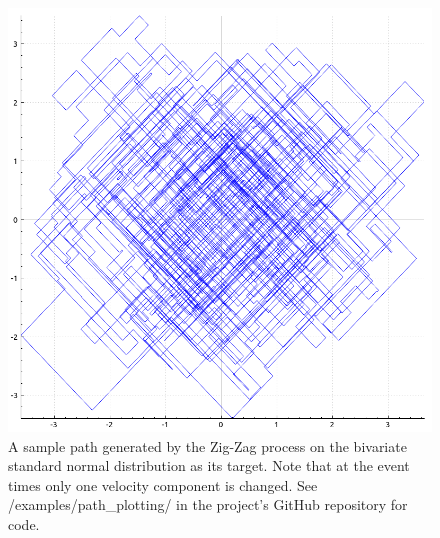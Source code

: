 \documentclass[report.tex]{subfiles}
\begin{document}
\begin{figure}
  \centering
  \includegraphics[width=.45\textwidth]{img/zig_zag_path}
  \caption{A sample path generated by the Zig-Zag process on the bivariate
     standard normal distribution as its target.
     Note that at the event times only one velocity component is changed.
     See /examples/path\_plotting/ in the project's GitHub repository for code.}
  \label{zig-zag-path}
\end{figure}
\end{document}

